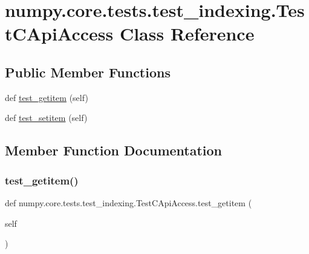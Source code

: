 \hypertarget{classnumpy_1_1core_1_1tests_1_1test__indexing_1_1TestCApiAccess}{}\section{numpy.\+core.\+tests.\+test\+\_\+indexing.\+Test\+C\+Api\+Access Class Reference}
\label{classnumpy_1_1core_1_1tests_1_1test__indexing_1_1TestCApiAccess}
\subsection*{Public Member Functions}
\begin{DoxyCompactItemize}
\item 
def \hyperlink{classnumpy_1_1core_1_1tests_1_1test__indexing_1_1TestCApiAccess_a5a4980ef5d55319cfd828e9c476b010d}{test\+\_\+getitem} (self)
\item 
def \hyperlink{classnumpy_1_1core_1_1tests_1_1test__indexing_1_1TestCApiAccess_a27d839744b8f9f2f30d5af3bbc61f147}{test\+\_\+setitem} (self)
\end{DoxyCompactItemize}


\subsection{Member Function Documentation}
\mbox{\label{classnumpy_1_1core_1_1tests_1_1test__indexing_1_1TestCApiAccess_a5a4980ef5d55319cfd828e9c476b010d}} 
\subsubsection{\texorpdfstring{test\+\_\+getitem()}{test\_getitem()}}
{\footnotesize\ttfamily def numpy.\+core.\+tests.\+test\+\_\+indexing.\+Test\+C\+Api\+Access.\+test\+\_\+getitem (\begin{DoxyParamCaption}\item[{}]{self }\end{DoxyParamCaption})}

